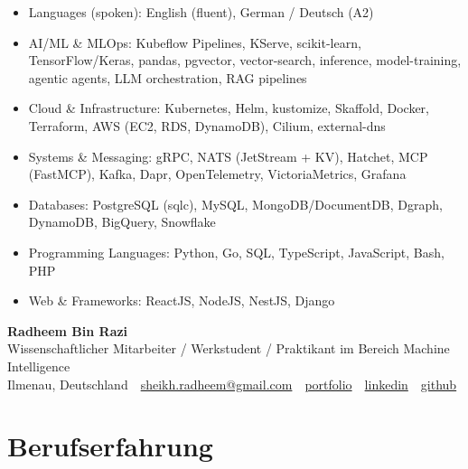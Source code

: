 \documentclass[10pt,a4paper]{resume}
\makeatletter
\newcommand{\Portfolio}{https://radheem.github.io/my-cv}
\newcommand{\PortfolioText}{portfolio}
\newcommand{\GitHub}{https://github.com/radheem}
\newcommand{\LinkedIn}{https://www.linkedin.com/in/radheem-razi}
\newcommand{\Email}{sheikh.radheem@gmail.com}
\makeatother
\begin{document}
\begin{itemize}[leftmargin=1.4em,nosep,topsep=2pt]
  \item Languages (spoken): English (fluent), German / Deutsch (A2)
  \item AI/ML \& MLOps: Kubeflow Pipelines, KServe, scikit-learn, TensorFlow/Keras, pandas, pgvector, vector-search, inference, model-training, agentic agents, LLM orchestration, RAG pipelines
  \item Cloud \& Infrastructure: Kubernetes, Helm, kustomize, Skaffold, Docker, Terraform, AWS (EC2, RDS, DynamoDB), Cilium, external-dns
  \item Systems \& Messaging: gRPC, NATS (JetStream + KV), Hatchet, MCP (FastMCP), Kafka, Dapr, OpenTelemetry, VictoriaMetrics, Grafana
  \item Databases: PostgreSQL (sqlc), MySQL, MongoDB/DocumentDB, Dgraph, DynamoDB, BigQuery, Snowflake
  \item Programming Languages: Python, Go, SQL, TypeScript, JavaScript, Bash, PHP
  \item Web \& Frameworks: ReactJS, NodeJS, NestJS, Django
\end{itemize}

\clearpage
{}

\begin{center}
  {\huge\bfseries Radheem Bin Razi}\\[3pt]
  {\large Wissenschaftlicher Mitarbeiter / Werkstudent / Praktikant im Bereich Machine Intelligence}\\[6pt]
  \small
  Ilmenau, Deutschland \,\textbar\,
  \href{mailto:\Email}{\Email} \,\textbar\,
  \href{\Portfolio}{\PortfolioText} \,\textbar\,
  \href{\LinkedIn}{linkedin} \,\textbar\,
  \href{\GitHub}{github}
\end{center}
\vspace{2pt}

\section{Berufserfahrung}
\end{document}
